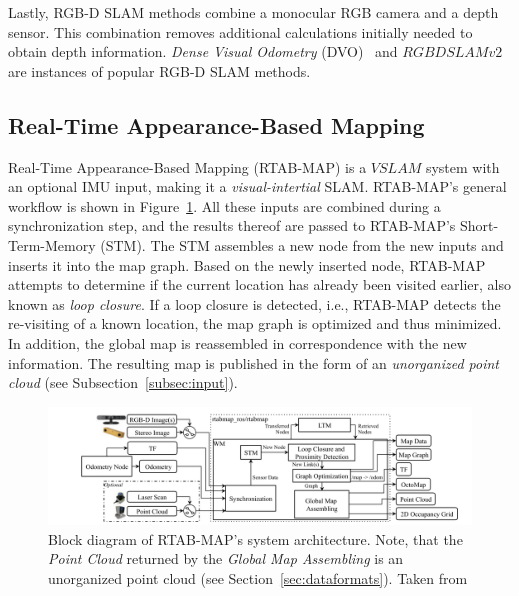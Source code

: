 \documentclass[main.tex]{subfiles}
\begin{document}
Lastly, RGB-D SLAM methods combine a monocular RGB camera and a depth sensor. This combination removes additional calculations
initially needed to obtain depth information. \textit{Dense Visual Odometry} (DVO)~\cite{Kerl_Sturm_Cremers_2013} and $RGBDSLAMv2$~\cite{endres20133} are instances of
popular RGB-D SLAM methods.




\subsection*{Real-Time Appearance-Based Mapping}
Real-Time Appearance-Based Mapping (RTAB-MAP) is a $VSLAM$ system with an optional IMU input, making it a \textit{visual-intertial} SLAM.
RTAB-MAP's general workflow is shown in Figure~\ref{fig:rtabmap}.
All these inputs are combined during a synchronization step, and the results thereof are passed to RTAB-MAP's Short-Term-Memory (STM).
The STM assembles a new node from the new inputs and inserts it into the map graph. Based on the newly inserted node, RTAB-MAP attempts to
determine if the current location has already been visited earlier, also known as \textit{loop closure}.
If a loop closure is detected, i.e., RTAB-MAP detects the re-visiting of a known location, the map graph is optimized and thus minimized.
In addition, the global map is reassembled in correspondence with the new information.
The resulting map is published in the form of an \textit{unorganized point cloud} (see Subsection~\ref{subsec:input}).

\begin{figure}[!h]
    \centering
    \includegraphics[width=15 cm]{images/rtabmap.png}
    \caption[RTAB-MAP Block Diagram]{Block diagram of RTAB-MAP's system architecture. Note, that the \textit{Point Cloud} returned by the \textit{Global Map Assembling}
        is an unorganized point cloud (see Section~\ref{sec:dataformats}).
        Taken from \cite[Figure~1]{Labbé_Michaud_2019}}
    \label{fig:rtabmap}
\end{figure}
\end{document}
